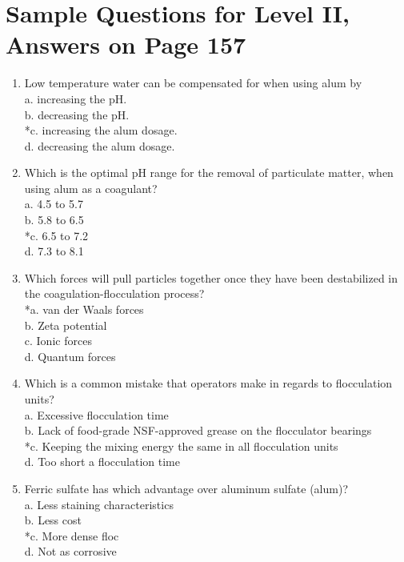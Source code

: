 \section{Sample Questions for Level II, Answers on Page 157}
\begin{enumerate}[label=TII-\arabic*]
  \item Low temperature water can be compensated for when using alum by\\
a. increasing the pH.\\
b. decreasing the pH.\\
*c. increasing the alum dosage.\\
d. decreasing the alum dosage.\\
  \item Which is the optimal pH range for the removal of particulate matter, when using alum as a coagulant?\\
a. 4.5 to 5.7\\
b. 5.8 to 6.5\\
*c. 6.5 to 7.2\\
d. 7.3 to 8.1\\
  \item Which forces will pull particles together once they have been destabilized in the coagulation-flocculation process?\\
*a. van der Waals forces\\
b. Zeta potential\\
c. Ionic forces\\
d. Quantum forces\\
  \item Which is a common mistake that operators make in regards to flocculation units?\\
a. Excessive flocculation time\\
b. Lack of food-grade NSF-approved grease on the flocculator bearings\\
*c. Keeping the mixing energy the same in all flocculation units\\
d. Too short a flocculation time\\
  \item Ferric sulfate has which advantage over aluminum sulfate (alum)?\\
a. Less staining characteristics\\
b. Less cost\\
*c. More dense floc\\
d. Not as corrosive\\
\end{enumerate}
